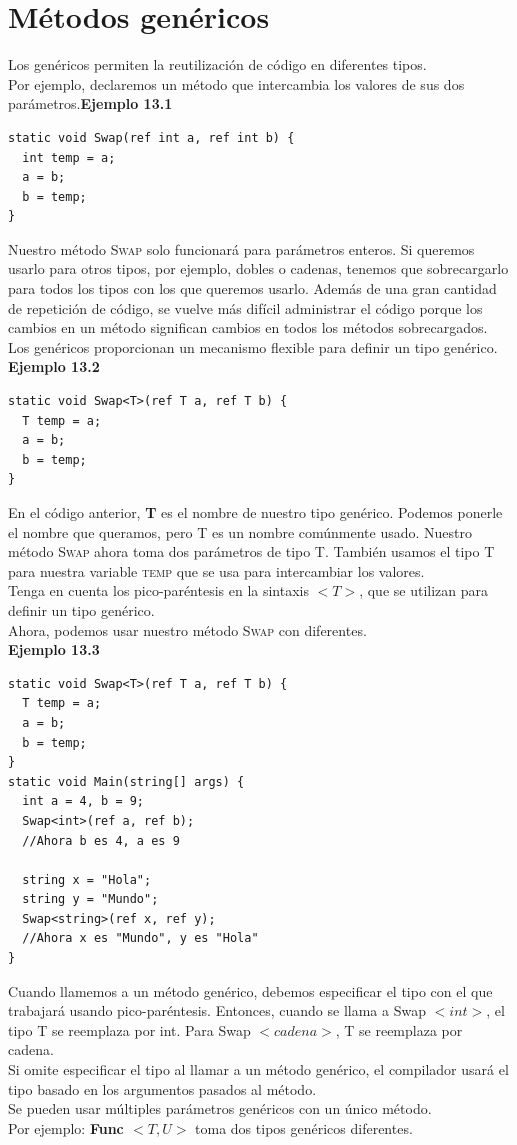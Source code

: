 \documentclass[12pt,a4paper]{report}
\begin{document}
\section{Métodos genéricos}
Los genéricos permiten la reutilización de código en diferentes tipos.\\Por ejemplo, declaremos un método que intercambia los valores de sus dos parámetros.\textbf{Ejemplo 13.1}
\begin{lstlisting}
static void Swap(ref int a, ref int b) {
  int temp = a;
  a = b;
  b = temp;
}
\end{lstlisting}Nuestro método\textsc{ Swap} solo funcionará para parámetros enteros. Si queremos usarlo para otros tipos, por ejemplo, dobles o cadenas, tenemos que sobrecargarlo para todos los tipos con los que queremos usarlo. Además de una gran cantidad de repetición de código, se vuelve más difícil administrar el código porque los cambios en un método significan cambios en todos los métodos sobrecargados.\\Los genéricos proporcionan un mecanismo flexible para definir un tipo genérico.\\\textbf{Ejemplo 13.2}
\begin{lstlisting}
static void Swap<T>(ref T a, ref T b) {
  T temp = a;
  a = b;
  b = temp;
}
\end{lstlisting}En el código anterior,\textbf{ T} es el nombre de nuestro tipo genérico. Podemos ponerle el nombre que queramos, pero T es un nombre comúnmente usado. Nuestro método\textsc{ Swap} ahora toma dos parámetros de tipo T. También usamos el tipo T para nuestra variable\textsc{ temp} que se usa para intercambiar los valores.\\Tenga en cuenta los pico-paréntesis en la sintaxis $ <T> $, que se utilizan para definir un tipo genérico.\\Ahora, podemos usar nuestro método \textsc{Swap} con diferentes.\\\textbf{Ejemplo 13.3}
\begin{lstlisting}
static void Swap<T>(ref T a, ref T b) {
  T temp = a;
  a = b;
  b = temp;
}
static void Main(string[] args) {
  int a = 4, b = 9;
  Swap<int>(ref a, ref b);
  //Ahora b es 4, a es 9

  string x = "Hola";
  string y = "Mundo";
  Swap<string>(ref x, ref y);
  //Ahora x es "Mundo", y es "Hola"
}
\end{lstlisting}Cuando llamemos a un método genérico, debemos especificar el tipo con el que trabajará usando pico-paréntesis. Entonces, cuando se llama a Swap $<int>$, el tipo T se reemplaza por int. Para Swap $<cadena>$, T se reemplaza por cadena.\\Si omite especificar el tipo al llamar a un método genérico, el compilador usará el tipo basado en los argumentos pasados al método.\\Se pueden usar múltiples parámetros genéricos con un único método.\\Por ejemplo:\textbf{ Func $<T, U>$} toma dos tipos genéricos diferentes.
\end{document}

